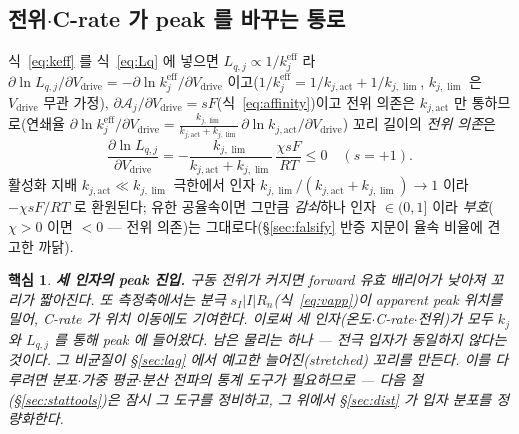 \documentclass[11pt,a4paper]{article}
\newtheorem*{keybox}{핵심}
\newcommand{\eff}{\mathrm{eff}}
\newcommand{\drive}{\mathrm{drive}}
\begin{document}
\subsection{전위$\cdot$C-rate 가 peak 를 바꾸는 통로}
식~\eqref{eq:keff} 를 식~\eqref{eq:Lq} 에 넣으면 $L_{q,j}\propto1/k_j^{\eff}$ 라 $\partial\ln L_{q,j}/\partial V_\drive=-\partial\ln k_j^{\eff}/\partial V_\drive$ 이고($1/k_j^{\eff}=1/k_{j,\mathrm{act}}+1/k_{j,\lim}$,
$k_{j,\lim}$ 은 $V_\drive$ 무관 가정), $\partial\mathcal A_j/\partial V_\drive=sF$(식~\eqref{eq:affinity})이고 전위 의존은
$k_{j,\mathrm{act}}$ 만 통하므로(연쇄율 $\partial\ln k_j^{\eff}/\partial V_\drive=\tfrac{k_{j,\lim}}{k_{j,\mathrm{act}}+k_{j,\lim}}\,\partial\ln k_{j,\mathrm{act}}/\partial V_\drive$)
꼬리 길이의 \emph{전위 의존}은
\begin{equation}
\frac{\partial\ln L_{q,j}}{\partial V_\drive}=-\frac{k_{j,\lim}}{k_{j,\mathrm{act}}+k_{j,\lim}}\,\frac{\chi sF}{RT}\le0\quad(s=+1).
\label{eq:LqV}
\end{equation}
활성화 지배 $k_{j,\mathrm{act}}\ll k_{j,\lim}$ 극한에서 인자 $k_{j,\lim}/(k_{j,\mathrm{act}}+k_{j,\lim})\to1$ 이라 $-\chi sF/RT$ 로
환원된다; 유한 공율속이면 그만큼 \emph{감쇠}하나 인자 $\in(0,1]$ 이라 \emph{부호}($\chi>0$ 이면 $<0$ — 전위 의존)는
그대로다(\S\ref{sec:falsify} 반증 지문이 율속 비율에 견고한 까닭).
\begin{keybox}
\textbf{세 인자의 peak 진입.} 구동 전위가 커지면 forward 유효 배리어가 낮아져 꼬리가 \emph{짧아진다}. 또 측정축에서는 분극
$s_I|I|R_n$(식~\eqref{eq:vapp})이 apparent peak 위치를 밀어, C-rate 가 \emph{위치} 이동에도 기여한다. \emph{이로써
세 인자(온도$\cdot$C-rate$\cdot$전위)가 모두 $k_j$ 와 $L_{q,j}$ 를 통해 peak 에 들어왔다.} 남은 물리는 하나 —
전극 입자가 \emph{동일하지 않다}는 것이다. 그 비균질이 \S\ref{sec:lag} 에서 예고한 \emph{늘어진}(stretched) 꼬리를
만든다. 이를 다루려면 분포$\cdot$가중 평균$\cdot$분산 전파의 통계 도구가 필요하므로 — \emph{다음 절
(\S\ref{sec:stattools})은 잠시 그 도구를 정비}하고, 그 위에서 \S\ref{sec:dist} 가 입자 분포를 정량화한다.
\end{keybox}

\end{document}
